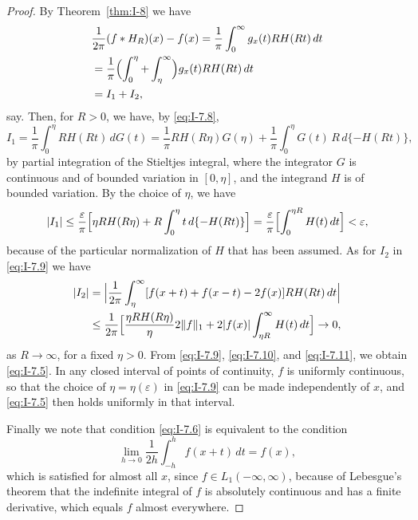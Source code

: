 \begin{proof}
By Theorem~\ref{thm:I-8} we have
\begin{equation}\label{eq:I-7.9}
\begin{aligned}
&\frac{1}{2\pi}(f*H_R)(x)-f(x) = \frac{1}{\pi}\int_0^\infty g_x(t)RH(Rt)\,dt\\
&= \frac{1}{\pi}\Bigl(\int_0^\eta+\int_\eta^\infty\Bigr)g_x(t)RH(Rt)\,dt\\
&= I_1+I_2,
\end{aligned}
\end{equation}
say. Then, for $R>0$, we have, by \eqref{eq:I-7.8},
\begin{equation*}
I_1=\frac{1}{\pi}\int_0^\eta RH(Rt)\,dG(t)
=\frac{1}{\pi}RH(R\eta)G(\eta)+\frac{1}{\pi}\int_0^\eta G(t)\,R\,d\{-H(Rt)\},
\end{equation*}
by partial integration of the Stieltjes integral, where the integrator $G$ is continuous and of bounded variation in $[0,\eta]$, and the integrand $H$ is of bounded variation. By the choice of $\eta$, we have
\begin{equation}\label{eq:I-7.10}
|I_1|\le\frac{\varepsilon}{\pi}\Bigl[\eta RH(R\eta)+R\int_0^\eta t\,d\{-H(Rt)\}\Bigr]
=\frac{\varepsilon}{\pi}\Bigl[\int_0^{\eta R}H(t)\,dt\Bigr]<\varepsilon,
\end{equation}
because of the particular normalization of $H$ that has been assumed. As for $I_2$ in \eqref{eq:I-7.9} we have
\begin{equation}\label{eq:I-7.11}
\begin{aligned}
|I_2| &= \Bigl|\frac{1}{2\pi}\int_\eta^\infty[f(x+t)+f(x-t)-2f(x)]RH(Rt)\,dt\Bigr|\\
&\le \frac{1}{2\pi}\Bigl[\frac{\eta RH(R\eta)}{\eta}2\|f\|_1+2|f(x)|\int_{\eta R}^\infty H(t)\,dt\Bigr]\to 0,
\end{aligned}
\end{equation}
as $R\to\infty$, for a fixed $\eta>0$. From \eqref{eq:I-7.9}, \eqref{eq:I-7.10}, and \eqref{eq:I-7.11}, we obtain \eqref{eq:I-7.5}. In any closed interval of points of continuity, $f$ is uniformly continuous, so that the choice of $\eta=\eta(\varepsilon)$ in \eqref{eq:I-7.9} can be made independently of $x$, and \eqref{eq:I-7.5} then holds uniformly in that interval.

Finally we note that condition \eqref{eq:I-7.6} is equivalent to the condition
\begin{equation*}
\lim_{h\to 0}\frac{1}{2h}\int_{-h}^{h}f(x+t)\,dt=f(x),
\end{equation*}
which is satisfied for almost all $x$, since $f\in L_1(-\infty,\infty)$, because of Lebesgue's theorem that the indefinite integral of $f$ is absolutely continuous and has a finite derivative, which equals $f$ almost everywhere.
\end{proof}

